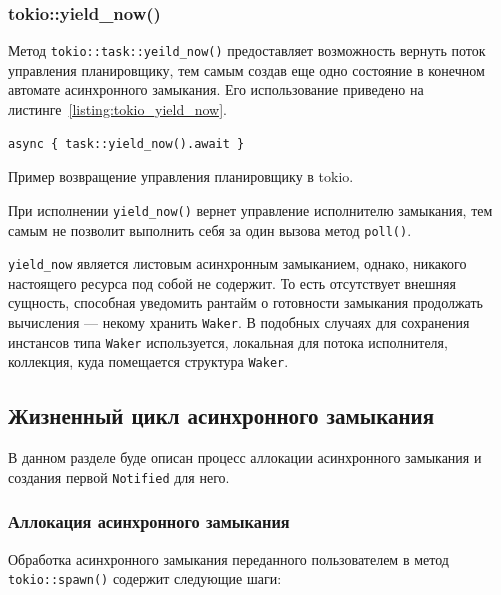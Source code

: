 \subsubsection{tokio::yield\_now()}

Метод \verb|tokio::task::yeild_now()| предоставляет возможность вернуть поток управления планировщику, тем самым создав еще одно состояние в конечном автомате асинхронного замыкания. Его использование приведено на листинге~\ref{listing:tokio_yield_now}.

\begin{listing}[H]
    \begin{verbatim}
async { task::yield_now().await }
    \end{verbatim}

    \caption{Пример возвращение управления планировщику в tokio.}
    \label{listing:tokio_yield_now}
\end{listing}

При исполнении \verb|yield_now()| вернет управление исполнителю замыкания, тем самым не позволит выполнить себя за один вызова метод \verb|poll()|.

\verb|yield_now| является листовым асинхронным замыканием, однако, никакого настоящего ресурса под собой не содержит. То есть отсутствует внешняя сущность, способная уведомить рантайм о готовности замыкания продолжать вычисления --- некому хранить \verb|Waker|. В подобных случаях для сохранения инстансов типа \verb|Waker| используется, локальная для потока исполнителя, коллекция, куда помещается структура \verb|Waker|.

\subsection{Жизненный цикл асинхронного замыкания}

В данном разделе буде описан процесс аллокации асинхронного замыкания и создания первой \verb|Notified| для него.

\subsubsection{Аллокация асинхронного замыкания}

Обработка асинхронного замыкания переданного пользователем в метод \verb|tokio::spawn()| содержит следующие шаги:

